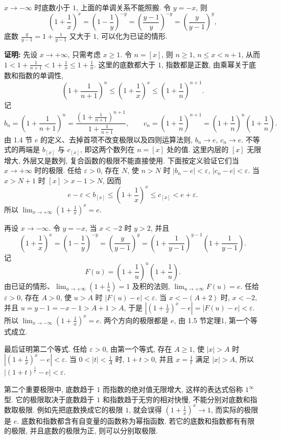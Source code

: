 \documentclass[UTF8,openany]{ctexbook}
\theoremstyle{chinesetextbook}
\newenvironment{cnproof}{\par\indent\textbf{证明:} \ignorespaces}{\par}
\begin{document}
$x\to-\infty$ 时底数小于 $1$, 上面的单调关系不能照搬. 令 $y=-x$, 则
\[
\left(1+\frac1x\right)^x=\left(1-\frac1y\right)^{-y}=\left(\frac{y-1}y\right)^{-y}=\left(\frac y{y-1}\right)^y,
\]
底数 $\displaystyle\frac y{y-1}=1+\frac1{y-1}$ 又大于 $1$, 可以化为已证的情形.
\begin{cnproof}
先设 $x\to+\infty$, 只需考虑 $x\ge1$. 令 $n=[x]$, 则 $n\ge1$, $n\le x<n+1$, 从而 $\displaystyle1<1+\frac1{n+1}<1+\frac1x\le1+\frac1n$. 这里的底数都大于 $1$, 指数都是正数, 由乘幂关于底数和指数的单调性,
\[
\left(1+\frac1{n+1}\right)^n\le\left(1+\frac1x\right)^x\le\left(1+\frac1n\right)^{n+1}.
\]
记
\[
b_n=\left(1+\frac1{n+1}\right)^n=\frac{\left(1+\frac1{n+1}\right)^{n+1}}{1+\frac1{n+1}},\qquad c_n=\left(1+\frac1n\right)^{n+1}=\left(1+\frac1n\right)^n\left(1+\frac1n\right).
\]
由 1.4 节 $e$ 的定义、去掉首项不改变极限以及四则运算法则, $b_n\to e$, $c_n\to e$. 不等式的两端是 $b_{[x]}$ 与 $c_{[x]}$, 即这两个数列在 $n=[x]$ 处的值. 这里内层的 $[x]$ 无限增大, 外层又是数列, 复合函数的极限不能直接使用. 下面按定义验证它们当 $x\to+\infty$ 时的极限. 任给 $\varepsilon>0$, 存在 $N$, 使 $n>N$ 时 $|b_n-e|<\varepsilon$, $|c_n-e|<\varepsilon$. 当 $x>N+1$ 时 $[x]>x-1>N$, 因而
\[
e-\varepsilon<b_{[x]}\le\left(1+\frac1x\right)^x\le c_{[x]}<e+\varepsilon.
\]
所以 $\displaystyle\lim_{x\to+\infty}\left(1+\frac1x\right)^x=e$.

再设 $x\to-\infty$. 令 $y=-x$, 当 $x<-2$ 时 $y>2$, 并且
\[
\left(1+\frac1x\right)^x=\left(1-\frac1y\right)^{-y}=\left(\frac y{y-1}\right)^y=\left(1+\frac1{y-1}\right)^{y-1}\left(1+\frac1{y-1}\right).
\]
记
\[
F(u)=\left(1+\frac1u\right)^u\left(1+\frac1u\right).
\]
由已证的情形、$\displaystyle\lim_{u\to+\infty}\left(1+\frac1u\right)=1$ 及积的法则, $\displaystyle\lim_{u\to+\infty}F(u)=e$. 任给 $\varepsilon>0$, 存在 $A>0$, 使 $u>A$ 时 $|F(u)-e|<\varepsilon$. 当 $x<-(A+2)$ 时, $x<-2$, 并且 $u=y-1=-x-1>A+1>A$, 于是 $\displaystyle\left|\left(1+\frac1x\right)^x-e\right|=|F(u)-e|<\varepsilon$. 所以 $\displaystyle\lim_{x\to-\infty}\left(1+\frac1x\right)^x=e$. 两个方向的极限都是 $e$, 由 1.5 节定理1, 第一个等式成立.

最后证明第二个等式. 任给 $\varepsilon>0$, 由第一个等式, 存在 $A\ge1$, 使 $|x|>A$ 时 $\displaystyle\left|\left(1+\frac1x\right)^x-e\right|<\varepsilon$. 当 $\displaystyle0<|t|<\frac1A$ 时, $1+t>0$, 并且 $\displaystyle x=\frac1t$ 满足 $|x|>A$, 所以 $\bigl|(1+t)^{\frac1t}-e\bigr|<\varepsilon$.
\end{cnproof}
第二个重要极限中, 底数趋于 $1$ 而指数的绝对值无限增大, 这样的表达式俗称 $1^\infty$ 型. 它的极限取决于底数趋于 $1$ 和指数趋于无穷的相对快慢, 不能分别对底数和指数取极限. 例如先把底数换成它的极限 $1$, 就会误得 $\displaystyle\left(1+\frac1x\right)^x\to1$, 而实际的极限是 $e$. 底数和指数都含有自变量的函数称为幂指函数. 若它的底数和指数都有有限的极限, 并且底数的极限为正, 则可以分别取极限.
\end{document}
